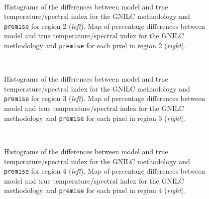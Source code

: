 \documentclass[a4paper,fleqn,usenatbib]{mnras}
\begin{document}
\begin{figure}
\centering
{}\,
\,
\caption{Histograms of the differences between model and true temperature/spectral index for the GNILC methodology and {\texttt{premise}} for region 2 ({\it{left}}). Map of percentage differences between model and true temperature/spectral index for the GNILC methodology and {\texttt{premise}} for each pixel in region 2 ({\it{right}}).}
\label{fig:histmap5}
\end{figure}

\begin{figure}
\centering
{}\,
\,
\caption{Histograms of the differences between model and true temperature/spectral index for the GNILC methodology and {\texttt{premise}} for region 3 ({\it{left}}). Map of percentage differences between model and true temperature/spectral index for the GNILC methodology and {\texttt{premise}} for each pixel in region 3 ({\it{right}}).}
\label{fig:histmap6}
\end{figure}

\begin{figure}
\centering
{}\,
\,
\caption{Histograms of the differences between model and true temperature/spectral index for the GNILC methodology and {\texttt{premise}} for region 4 ({\it{left}}). Map of percentage differences between model and true temperature/spectral index for the GNILC methodology and {\texttt{premise}} for each pixel in region 4 ({\it{right}}).}
\label{fig:histmap9}
\end{figure}
\end{document}
